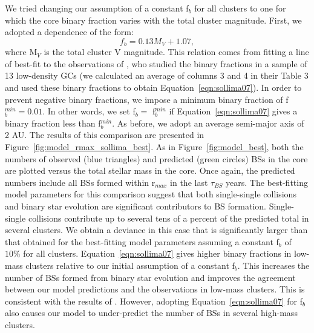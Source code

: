 We tried changing our assumption of a constant f$_b$ for all
clusters to one for which the core binary fraction varies with the
total cluster magnitude.  First, we adopted a dependence of the
form:
\begin{equation}
\label{eqn:sollima07} 
f_b = 0.13M_V + 1.07,
\end{equation}
where M$_V$ is the total cluster V magnitude.  This 
relation comes from fitting a line of best-fit to the observations of 
\citet{sollima07}, who studied the binary fractions in a sample
of 13 low-density GCs (we calculated an average of
columns 3 and 4 in their Table 3 and used these binary fractions to
obtain Equation~\ref{eqn:sollima07}).  In order to prevent negative
binary fractions, 
we impose a minimum binary fraction of f$_b^{min} = 0.01$.  In other
words, we set f$_b =$ f$_b^{min}$ if Equation~\ref{eqn:sollima07}
gives a binary fraction less than f$_b^{min}$.  As before, we adopt an
average semi-major axis of 2 AU.  The results of this comparison are
presented in Figure~\ref{fig:model_rmax_sollima_best}.  As in
Figure~\ref{fig:model_best}, both the numbers of 
observed (blue triangles) and predicted (green circles) BSs in the
core are plotted 
versus the total stellar mass in the core.  Once again, the predicted
numbers include all BSs formed within r$_{max}$ in the last
$\tau_{BS}$ years.  The best-fitting model parameters for this
comparison suggest that both single-single collisions and binary star
evolution are significant contributors to BS formation.  Single-single
collisions contribute up to several tens of a percent of the predicted
total in several clusters.  We obtain a 
deviance in this case that is significantly larger than that obtained
for the best-fitting model parameters assuming a constant f$_b$ of
$10\%$ for all clusters.  Equation~\ref{eqn:sollima07} gives higher
binary fractions in low-mass
clusters relative to our initial assumption of a constant f$_b$.  This
increases the number of BSs formed from binary star evolution and
improves the agreement between our model predictions and the
observations in low-mass clusters.  This is consistent with the
results of \citet{sollima08}.  However, adopting
Equation~\ref{eqn:sollima07} for f$_b$ also causes our model to
under-predict the number of BSs in several high-mass clusters.

